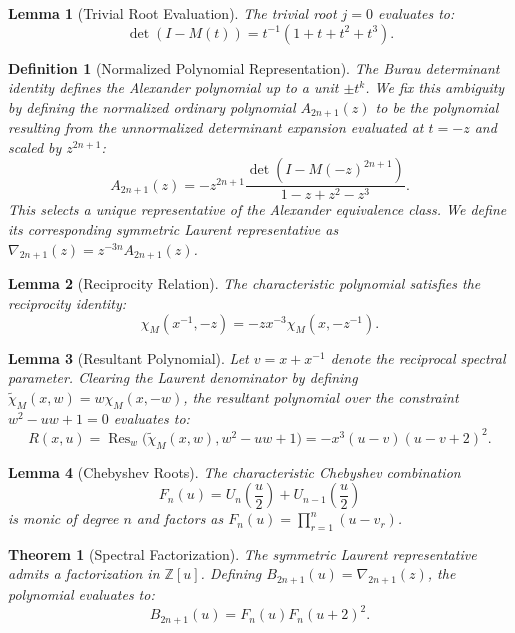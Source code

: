 \documentclass[10pt,a4paper]{amsart}
\newtheorem{lemma}{Lemma}
\newtheorem{definition}{Definition}
\newtheorem{theorem}{Theorem}
\begin{document}
\begin{lemma}[Trivial Root Evaluation]\label{lem:trivial_root}
The trivial root $j=0$ evaluates to:
\[ \det(I - M(t)) = t^{-1}(1 + t + t^2 + t^3). \]
\end{lemma}

\begin{definition}[Normalized Polynomial Representation]\label{def:recip_poly}
The Burau determinant identity defines the Alexander polynomial up to a unit $\pm t^k$. We fix this ambiguity by defining the normalized ordinary polynomial $A_{2n+1}(z)$ to be the polynomial resulting from the unnormalized determinant expansion evaluated at $t=-z$ and scaled by $z^{2n+1}$:
\begin{equation}
A_{2n+1}(z) = -z^{2n+1} \frac{\det(I - M(-z)^{2n+1})}{1-z+z^2-z^3}.
\end{equation}
This selects a unique representative of the Alexander equivalence class. We define its corresponding symmetric Laurent representative as $\nabla_{2n+1}(z) = z^{-3n} A_{2n+1}(z)$.
\end{definition}

\begin{lemma}[Reciprocity Relation]\label{lem:reciprocity}
The characteristic polynomial satisfies the reciprocity identity:
\[
\chi_M(x^{-1},-z) = -zx^{-3}\chi_M(x,-z^{-1}).
\]
\end{lemma}

\begin{lemma}[Resultant Polynomial]\label{lem:resultant}
Let $v = x + x^{-1}$ denote the reciprocal spectral parameter. Clearing the Laurent denominator by defining $\widetilde{\chi}_M(x, w) = w \chi_M(x, -w)$, the resultant polynomial over the constraint $w^2-uw+1=0$ evaluates to:
\begin{equation}
R(x, u) = \operatorname{Res}_w\big(\widetilde{\chi}_M(x, w), w^2-uw+1\big) = -x^3 (u-v)(u-v+2)^2.
\end{equation}
\end{lemma}

\begin{lemma}[Chebyshev Roots]\label{lem:cheb_roots}
The characteristic Chebyshev combination 
\begin{equation}
F_n(u) = U_n\left(\frac{u}{2}\right) + U_{n-1}\left(\frac{u}{2}\right)
\end{equation}
is monic of degree $n$ and factors as $F_n(u) = \prod_{r=1}^n (u - v_r)$.
\end{lemma}

\begin{theorem}[Spectral Factorization]\label{thm:spectral_fact}
The symmetric Laurent representative admits a factorization in $\mathbb{Z}[u]$. Defining $B_{2n+1}(u) = \nabla_{2n+1}(z)$, the polynomial evaluates to:
\begin{equation}
B_{2n+1}(u) = F_n(u)F_n(u+2)^2.
\end{equation}
\end{theorem}
\end{document}
